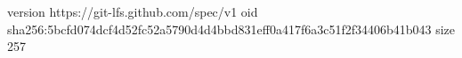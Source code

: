 version https://git-lfs.github.com/spec/v1
oid sha256:5bcfd074dcf4d52fc52a5790d4d4bbd831eff0a417f6a3c51f2f34406b41b043
size 257
